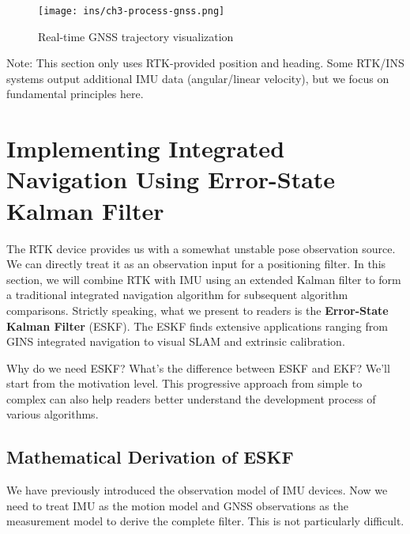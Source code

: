 \begin{figure}
	\centering
	\texttt{[image: ins/ch3-process-gnss.png]}
	\caption{Real-time GNSS trajectory visualization}
	\label{fig:process-gnss}
\end{figure}

Note: This section only uses RTK-provided position and heading. Some RTK/INS systems output additional IMU data (angular/linear velocity), but we focus on fundamental principles here.

\section{Implementing Integrated Navigation Using Error-State Kalman Filter}
The RTK device provides us with a somewhat unstable pose observation source. We can directly treat it as an observation input for a positioning filter. In this section, we will combine RTK with IMU using an extended Kalman filter to form a traditional integrated navigation algorithm for subsequent algorithm comparisons. Strictly speaking, what we present to readers is the \textbf{Error-State Kalman Filter} (ESKF). The ESKF finds extensive applications ranging from GINS integrated navigation to visual SLAM\cite{Kleinert2010,Li2013,Davison2003} and extrinsic calibration\cite{Kelly2011,Mirzaei2008}. 

Why do we need ESKF? What's the difference between ESKF and EKF? We'll start from the motivation level. This progressive approach from simple to complex can also help readers better understand the development process of various algorithms.

\subsection{Mathematical Derivation of ESKF}
We have previously introduced the observation model of IMU devices. Now we need to treat IMU as the motion model and GNSS observations as the measurement model to derive the complete filter. This is not particularly difficult.

